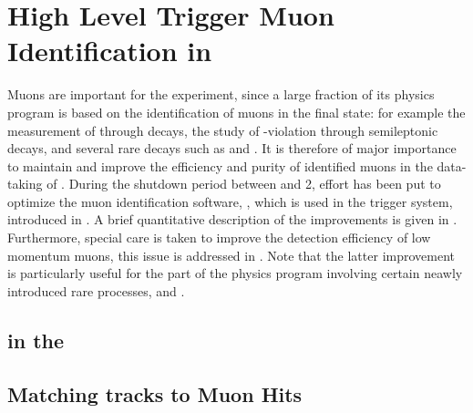 \chapter{High Level Trigger Muon Identification in \runtwo}
\label{Muon_id_hlt}

Muons are important for the \lhcb experiment, since a large fraction of its physics program is based on
the identification of muons in the final state: for example the measurement of \phis through \BsJpsiPhi decays,
the study of \CP-violation through semileptonic decays, and several rare decays such as \BdKstmumu and \Bsmm.
It is therefore of major importance to maintain and improve the efficiency and purity of identified muons in
the \runtwo data-taking of \lhcb. During the shutdown period between \runone and 2, effort has been put to 
optimize the muon identification software, \muonID, which is used in the \lhcb trigger system, introduced in .
A brief quantitative description of the \muonID improvements is given in .
Furthermore, special care is taken to improve the detection efficiency of low momentum muons, this issue is
addressed in . Note that the latter improvement is particularly useful for the part
of the \lhcb physics program involving certain neawly introduced rare processes, \eg \Sigmapmumu \cite{LHCB-CONF-2016-013-001} and \Ksmumu \cite{LHCb-CONF-2016-012}.

\section{\hltone \muonID in the \lhc \runtwo}
\label{muid_hlt1}


\section{Matching \velo tracks to Muon Hits}
\label{mvm_algorrithm}

